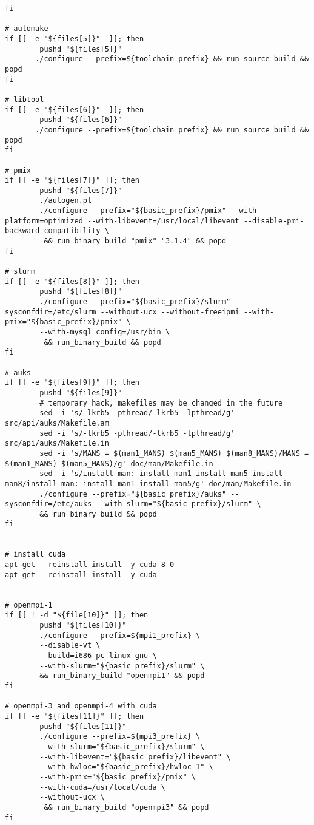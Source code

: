 \documentclass[a4paper]{extarticle}
\begin{document}
\begin{verbatim}
fi

# automake
if [[ -e "${files[5]}"  ]]; then
        pushd "${files[5]}"
       ./configure --prefix=${toolchain_prefix} && run_source_build && popd
fi

# libtool
if [[ -e "${files[6]}"  ]]; then
        pushd "${files[6]}"
       ./configure --prefix=${toolchain_prefix} && run_source_build && popd
fi

# pmix
if [[ -e "${files[7]}" ]]; then
        pushd "${files[7]}"
        ./autogen.pl
        ./configure --prefix="${basic_prefix}/pmix" --with-platform=optimized --with-libevent=/usr/local/libevent --disable-pmi-backward-compatibility \
         && run_binary_build "pmix" "3.1.4" && popd
fi

# slurm
if [[ -e "${files[8]}" ]]; then
        pushd "${files[8]}"
        ./configure --prefix="${basic_prefix}/slurm" --sysconfdir=/etc/slurm --without-ucx --without-freeipmi --with-pmix="${basic_prefix}/pmix" \
        --with-mysql_config=/usr/bin \
         && run_binary_build && popd
fi

# auks
if [[ -e "${files[9]}" ]]; then
        pushd "${files[9]}"
        # temporary hack, makefiles may be changed in the future
        sed -i 's/-lkrb5 -pthread/-lkrb5 -lpthread/g' src/api/auks/Makefile.am
        sed -i 's/-lkrb5 -pthread/-lkrb5 -lpthread/g' src/api/auks/Makefile.in
        sed -i 's/MANS = $(man1_MANS) $(man5_MANS) $(man8_MANS)/MANS = $(man1_MANS) $(man5_MANS)/g' doc/man/Makefile.in
        sed -i 's/install-man: install-man1 install-man5 install-man8/install-man: install-man1 install-man5/g' doc/man/Makefile.in
        ./configure --prefix="${basic_prefix}/auks" --sysconfdir=/etc/auks --with-slurm="${basic_prefix}/slurm" \
        && run_binary_build && popd
fi


# install cuda
apt-get --reinstall install -y cuda-8-0
apt-get --reinstall install -y cuda


# openmpi-1
if [[ ! -d "${file[10]}" ]]; then
        pushd "${files[10]}"
        ./configure --prefix=${mpi1_prefix} \
        --disable-vt \
        --build=i686-pc-linux-gnu \
        --with-slurm="${basic_prefix}/slurm" \
        && run_binary_build "openmpi1" && popd
fi

# openmpi-3 and openmpi-4 with cuda
if [[ -e "${files[11]}" ]]; then
        pushd "${files[11]}"
        ./configure --prefix=${mpi3_prefix} \
        --with-slurm="${basic_prefix}/slurm" \
        --with-libevent="${basic_prefix}/libevent" \
        --with-hwloc="${basic_prefix}/hwloc-1" \
        --with-pmix="${basic_prefix}/pmix" \
        --with-cuda=/usr/local/cuda \
        --without-ucx \
         && run_binary_build "openmpi3" && popd
fi


\end{verbatim}
\end{document}
